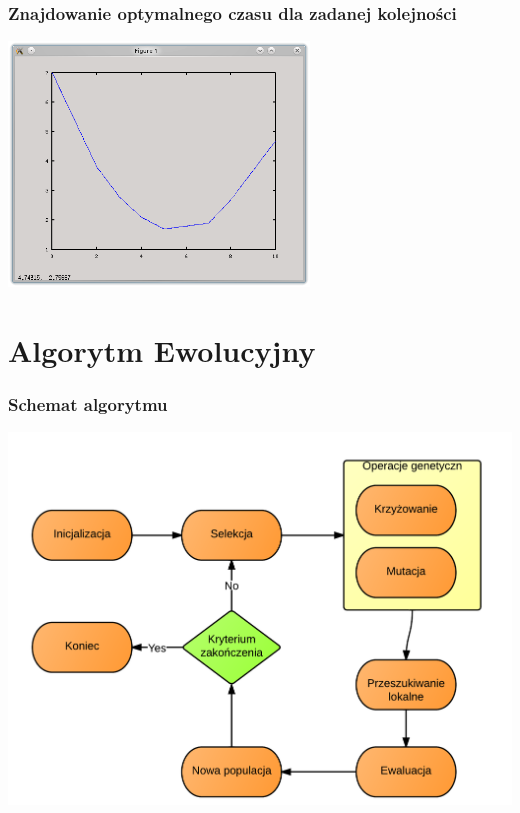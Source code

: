 \documentclass{beamer}
\begin{document}
 \begin{frame}
 \frametitle{ Znajdowanie optymalnego czasu dla zadanej kolejności }
 \begin{center}
  \includegraphics[width=8cm]{Grafika/wykres2.png}
 \end{center}
 \end{frame}




\section{Algorytm Ewolucyjny}

\begin{frame}
 \frametitle{Schemat algorytmu}
 \begin{center}
 \includegraphics[scale=0.18]{./Grafika/schemat.png}
\end{center}

\end{frame}
\end{document}
